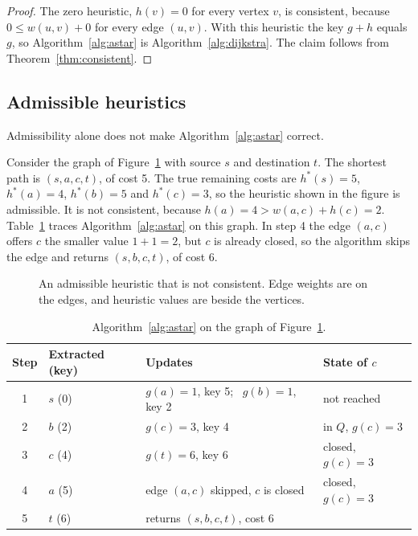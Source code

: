 \begin{proof}
The zero heuristic, $h(v) = 0$ for every vertex $v$, is consistent, because
$0 \le w(u,v) + 0$ for every edge $(u,v)$. With this heuristic the key $g + h$
equals $g$, so Algorithm~\ref{alg:astar} is Algorithm~\ref{alg:dijkstra}. The
claim follows from Theorem~\ref{thm:consistent}.
\end{proof}

\subsection{Admissible heuristics}\label{sec:admissible-proof}

Admissibility alone does not make Algorithm~\ref{alg:astar} correct.

\begin{example}\label{ex:inconsistent}
Consider the graph of Figure~\ref{fig:counterexample} with source $s$ and destination
$t$. The shortest path is $(s, a, c, t)$, of cost 5. The true remaining costs
are $h^{*}(s) = 5$, $h^{*}(a) = 4$, $h^{*}(b) = 5$ and $h^{*}(c) = 3$, so the
heuristic shown in the figure is admissible. It is not consistent, because
$h(a) = 4 > w(a,c) + h(c) = 2$. Table~\ref{tab:counterexample} traces
Algorithm~\ref{alg:astar} on this graph. In step 4 the edge $(a,c)$ offers $c$
the smaller value $1 + 1 = 2$, but $c$ is already closed, so the algorithm skips
the edge and returns $(s, b, c, t)$, of cost 6.
\end{example}

\begin{figure}[htbp]
  \centering
  
  \caption{An admissible heuristic that is not consistent. Edge weights are on
    the edges, and heuristic values are beside the vertices.}\label{fig:counterexample}
\end{figure}

\begin{table}[htbp]
  \centering
  \caption{Algorithm~\ref{alg:astar} on the graph of
    Figure~\ref{fig:counterexample}.}\label{tab:counterexample}
  \begin{tabular}{@{}clll@{}}
    \toprule
    Step & Extracted (key) & Updates & State of $c$\\
    \midrule
    1 & $s$ (0) & $g(a) = 1$, key 5; \ $g(b) = 1$, key 2 & not reached\\
    2 & $b$ (2) & $g(c) = 3$, key 4 & in $Q$, $g(c) = 3$\\
    3 & $c$ (4) & $g(t) = 6$, key 6 & closed, $g(c) = 3$\\
    4 & $a$ (5) & \textcolor{cbRed}{edge $(a,c)$ skipped, $c$ is closed}
      & closed, $g(c) = 3$\\
    5 & $t$ (6) & returns $(s,b,c,t)$, cost \textcolor{cbRed}{6} & \\
    \bottomrule
  \end{tabular}
\end{table}

